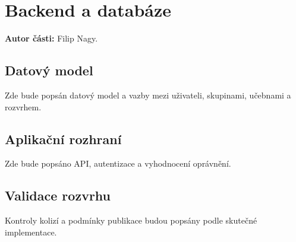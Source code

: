 \chapter{Backend a databáze}
\label{chap:backend}
\textbf{Autor části:} Filip Nagy.

\section{Datový model}
Zde bude popsán datový model a vazby mezi uživateli, skupinami, učebnami
a rozvrhem.

\section{Aplikační rozhraní}
Zde bude popsáno API, autentizace a vyhodnocení oprávnění.

\section{Validace rozvrhu}
Kontroly kolizí a podmínky publikace budou popsány podle skutečné implementace.
